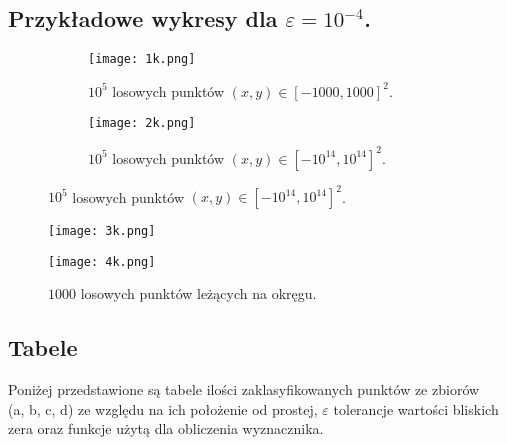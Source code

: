 
\subsection{Przykładowe wykresy dla $\varepsilon = 10^{-4}$.}
\null
\begin{figure}[!ht]
    \centering
    \begin{subfigure}{.5\textwidth}
      \centering
      \texttt{[image: 1k.png]}
      \caption{$10^5$ losowych punktów $(x, y) \in \left[-1000,1000\right]^{2}$.}
      \label{fig:sub1}
    \end{subfigure}%
    \begin{subfigure}{.5\textwidth}
      \centering
      \texttt{[image: 2k.png]}
      \caption{$10^5$ losowych punktów $(x, y) \in \left[-10^{14},10^{14}\right]^{2}$.}
      \label{fig:sub2}
    \end{subfigure}
    \label{fig:test}
    \end{figure}
    
    \begin{figure}[!ht]
    \centering
    \begin{minipage}{.5\textwidth}
      \centering
      \texttt{[image: 3k.png]}
      \caption{$1000$ losowych punktów leżących na okręgu.}
      \label{fig:test1}
    \end{minipage}%
    \begin{minipage}{.5\textwidth}
      \centering
      \texttt{[image: 4k.png]}
      \label{fig:test2}
    \end{minipage}
    \end{figure}
\subsection{Tabele}
\quad Poniżej przedstawione są tabele ilości zaklasyfikowanych punktów
 ze zbiorów \\ (a, b, c, d) ze względu na ich położenie od prostej, $\varepsilon$ tolerancje
 wartości bliskich zera oraz funkcje użytą dla obliczenia wyznacznika.\\ \\

